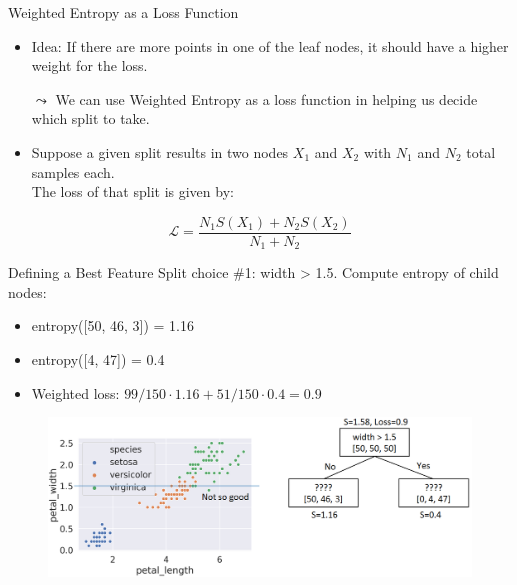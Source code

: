\documentclass[aspectratio=169]{../latex_main/tntbeamer}  %
\begin{document}
	
	\begin{frame}[c]{Weighted Entropy as a Loss Function}
	
	    \begin{itemize}
	        \item Idea: If there are more points in one of the leaf nodes, it should have a higher weight for the loss.
	        \item[$\leadsto$] We can use \alert{Weighted Entropy} as a loss function in helping us decide which split to take.
	        \item Suppose a given split results in two nodes $X_1$ and $X_2$ with $N_1$ and $N_2$ total samples each.\\ The loss of that split is given by:
	    \end{itemize}
	    
	    \begin{equation*}
	        \mathcal{L}=\frac{N_1S(X_1) + N_2S(X_2)}{N_1 + N_2}
	    \end{equation*}
	\end{frame}
	
	\begin{frame}{Defining a Best Feature}
	    Split choice \#1: width > 1.5. Compute entropy of child nodes:
	    \begin{itemize}
	        \item entropy([50, 46, 3]) = 1.16
	        \item entropy([4, 47]) = 0.4
	        \item Weighted loss: $99/150 \cdot 1.16 + 51/150 \cdot 0.4 = 0.9$
	    \end{itemize}
	    
	    \begin{figure}
	        \centering
	        \includegraphics[scale=.4]{figure_tree/Bild48}
	    \end{figure}
	\end{frame}
	
\end{document}
